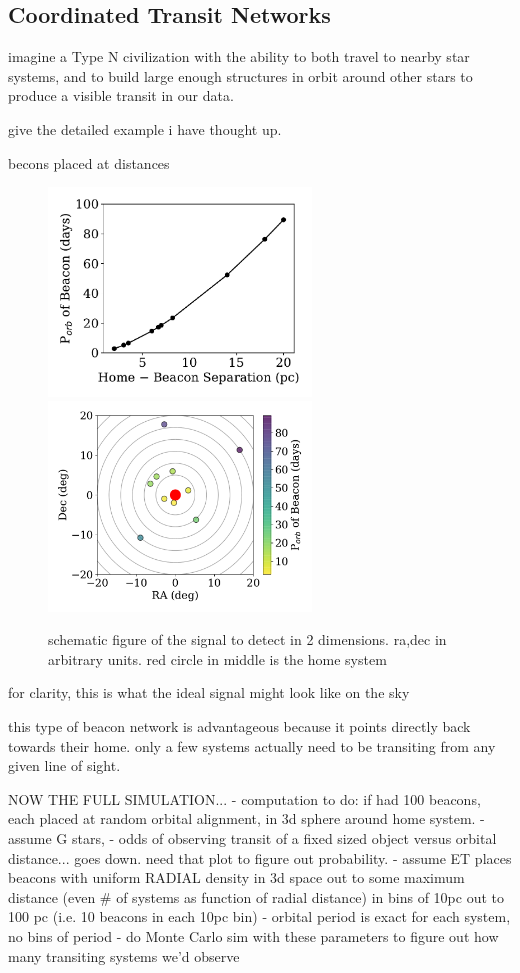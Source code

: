 \documentclass[twocolumn]{aastex62}
\begin{document}
\subsection{Coordinated Transit Networks}
imagine a Type N civilization with the ability to both travel to nearby star systems, and to build large enough structures in orbit around other stars to produce a visible transit in our data.

give the detailed example i have thought up.

becons placed at distances


\begin{figure}[]
\centering
\includegraphics[width=2.75in]{../figures/dist_per.pdf}
\includegraphics[width=2.75in]{../figures/sky_per.pdf}
\caption{schematic figure of the signal to detect in 2 dimensions. ra,dec in arbitrary units. red circle in middle is the home system}
\label{fig:2d}
\end{figure}


for clarity, this is what the ideal signal might look like on the sky



this type of beacon network is advantageous because it points directly back towards their home. only a few systems actually need to be transiting from any given line of sight.

NOW THE FULL SIMULATION...
- computation to do: if had 100 beacons, each placed at random orbital alignment, in 3d sphere around home system.
- assume G stars, 
- odds of observing transit of a fixed sized object versus orbital distance... goes down. need that plot to figure out probability. 
- assume ET places beacons with uniform RADIAL density in 3d space out to some maximum distance (even \# of systems as function of radial distance) in bins of 10pc out to 100 pc (i.e. 10 beacons in each 10pc bin)
- orbital period is exact for each system, no bins of period
- do Monte Carlo sim with these parameters to figure out how many transiting systems we'd observe 
\end{document}
